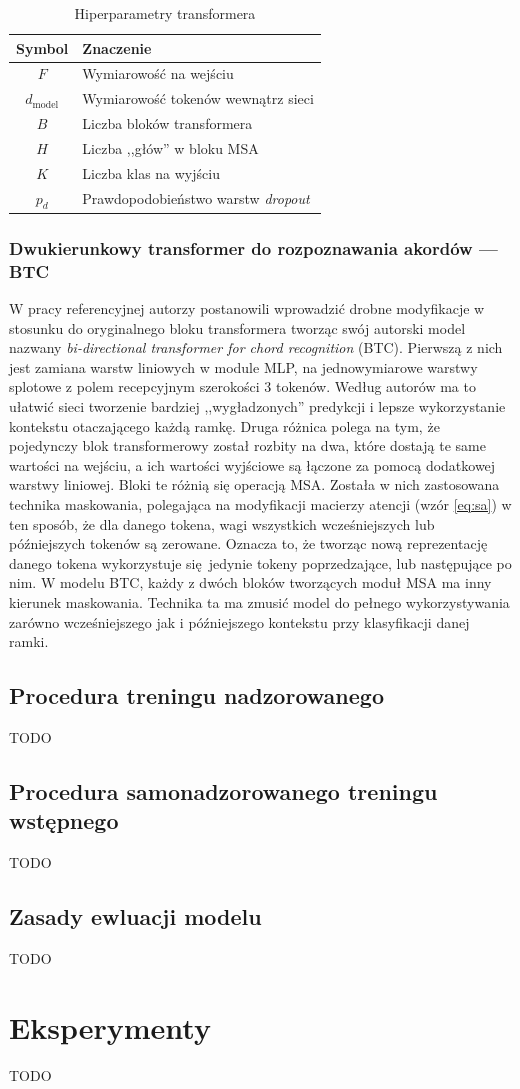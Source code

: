 \begin{table}
    \centering
    \caption{Hiperparametry transformera}
    \label{tab:transformer_params}
    \begin{tabular}{|c|l|} \hline
        Symbol & Znaczenie \\ \hline
        $F$ & Wymiarowość na wejściu \\
        $d_{\mathrm{model}}$ & Wymiarowość tokenów wewnątrz sieci \\
        $B$ & Liczba bloków transformera \\
        $H$ & Liczba ,,głów'' w bloku MSA \\
        $K$ & Liczba klas na wyjściu \\
        $p_d$ & Prawdopodobieństwo warstw \emph{dropout} \\ \hline
    \end{tabular}
\end{table}

\subsubsection{Dwukierunkowy transformer do rozpoznawania akordów --- BTC}

W pracy referencyjnej \cite{park_bi-directional_2019} autorzy postanowili wprowadzić drobne
modyfikacje w stosunku do oryginalnego bloku transformera tworząc swój autorski model nazwany
\emph{bi-directional transformer for chord recognition} (BTC). Pierwszą z nich jest zamiana warstw
liniowych w module MLP, na jednowymiarowe warstwy splotowe z polem recepcyjnym szerokości 3 tokenów.
Według autorów ma to ułatwić sieci tworzenie bardziej ,,wygładzonych'' predykcji i lepsze
wykorzystanie kontekstu otaczającego każdą ramkę. Druga różnica polega na tym, że pojedynczy blok
transformerowy został rozbity na dwa, które dostają te same wartości na wejściu, a ich wartości
wyjściowe są łączone za pomocą dodatkowej warstwy liniowej. Bloki te różnią się operacją MSA.
Została w nich zastosowana technika maskowania, polegająca na modyfikacji macierzy atencji (wzór
\ref{eq:sa}) w ten sposób, że dla danego tokena, wagi wszystkich wcześniejszych lub późniejszych
tokenów są zerowane. Oznacza to, że tworząc nową reprezentację danego tokena wykorzystuje
się jedynie tokeny poprzedzające, lub następujące po nim. W modelu BTC, każdy z dwóch bloków
tworzących moduł MSA ma inny kierunek maskowania. Technika ta ma zmusić model do pełnego
wykorzystywania zarówno wcześniejszego jak i późniejszego kontekstu przy klasyfikacji danej ramki.

\subsection{Procedura treningu nadzorowanego}
TODO

\subsection{Procedura samonadzorowanego treningu wstępnego}
TODO

\subsection{Zasady ewluacji modelu}
TODO


\section{Eksperymenty}
TODO

